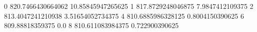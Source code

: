 0 820.7466430664062 10.85845947265625
1 817.8729248046875 7.9847412109375
2 813.4047241210938 3.51654052734375
4 810.6885986328125 0.8004150390625
6 809.88818359375 0.0
8 810.611083984375 0.722900390625
